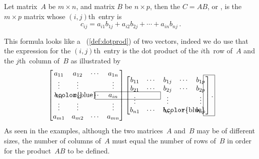 \begin{definition} \label{def:matprod}
  Let matrix~\(A\) be \(m\times n\), and matrix \(B\) be \(n\times 
  p\), then the  \(C=AB\), or 
  , is the \(m\times p\) matrix whose \((i,j)\)th~entry is
\begin{equation*}
c_{ij}=a_{i1}b_{1j}+a_{i2}b_{2j}+\cdots+a_{in}b_{nj}\,.
\end{equation*}
\end{definition}

This formula looks like a ~(\cref{def:dotprod}) of two vectors, indeed we do use that the expression for the \((i,j)\)th~entry is the dot product of the \(i\)th~row of~\(A\) and the \(j\)th~column of~\(B\) as illustrated by
\begin{equation*}
\begin{bmatrix} a_{11}&a_{12}&\cdots&a_{1n}
\\\vdots&\vdots&&\vdots
\\\rlap{\color{blue}\hspace{-0.2em}\framebox{\phantom{\rule{8.7em}{1ex}}}}
a_{i1}&a_{i2}&\cdots&a_{in}
\\\vdots&\vdots&&\vdots
\\a_{m1}&a_{m2}&\cdots&a_{mn} \end{bmatrix}
\begin{bmatrix} b_{11}&\cdots&b_{1j}&\cdots&b_{1p}
\\b_{21}&\cdots&b_{2j}&\cdots&b_{2p}
\\\vdots&&\vdots&&\vdots
\\b_{n1}&\cdots&
\rlap{\color{blue}\hspace{-0.25em}\smash{\framebox{\phantom{\rule[-0.5ex]{1em}{12ex}}}}}
b_{nj}&\cdots&b_{np} \end{bmatrix}.
\end{equation*}
As seen in the examples, although the two matrices~\(A\) and~\(B\) may be of different sizes, the number of columns of~\(A\) must equal the number of rows of~\(B\) in order for the product~\(AB\) to be defined.





